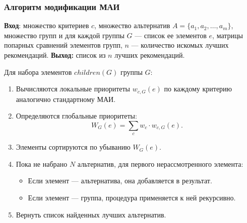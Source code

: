 \documentclass{beamer}
\begin{document}

\begin{frame}    
\frametitle{Алгоритм модификации МАИ}
{\footnotesize
\textbf{Вход}: множество критериев $c$, множество альтернатив \(A = \{a_1, a_2, \dots, a_m\}\), множество групп и для каждой группы \(G\) --- список ее элементов $e$, матрицы попарных сравнений элементов групп, $n$ --- количество искомых лучших рекомендаций. \textbf{Выход:} список из $n$ лучших рекомендаций.




Для набора элементов \(children(G)\) группы \(G\):
\begin{enumerate}
    \item Вычисляются локальные приоритеты \(w_{c,G}(e)\) по каждому критерию аналогично стандартному МАИ.
    \item Определяются глобальные приоритеты:
    \[
    W_G(e) = \sum_{c} w_c \cdot w_{c,G}(e).
    \]
    \item Элементы сортируются по убыванию \(W_G(e)\).
    \item Пока не набрано \(N\) альтернатив, для первого нерассмотренного элемента:
        \begin{itemize}
            \item Если элемент --- альтернатива, она добавляется в результат.
            \item Если элемент --- группа, процедура применяется к ней рекурсивно.
        \end{itemize}
    \item Вернуть список найденных лучших альтернатив.
\end{enumerate}
}
\end{frame}
\end{document}
